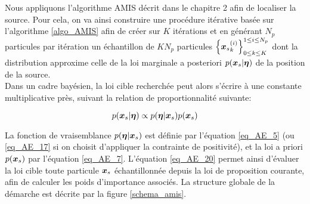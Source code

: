 Nous appliquons l'algorithme AMIS décrit dans le chapitre 2 afin de localiser la source. Pour cela, on va ainsi construire une procédure itérative basée sur l'algorithme \ref{algo_AMIS} afin de créer sur $K$ itérations et en générant $N_p$ particules par itération un échantillon de $KN_p$ particules {$\left\{{\bm{x}_s}_k^{(i)}\right\}_{0\leq k \leq K}^{1\leq i \leq N_p}$} dont la distribution approxime celle de la loi marginale a posteriori {$p({\bm{x}_s} | {\bm{\eta}})$} de la position de la source.\\

Dans un cadre bayésien, la loi cible recherchée peut alors s'écrire à une constante multiplicative près, suivant la relation de proportionnalité suivante:

\begin{equation}
{
p({\bm{x}_s}| {\bm{\eta}}) \propto p({\bm{\eta}}| {\bm{x}_s})p({\bm{x}_s})
\label{eq_AE_20}
}
\end{equation}

La fonction de vraisemblance {$p({\bm{\eta}} | {\bm{x}_s})$} est définie par l'équation \eqref{eq_AE_5} (ou \eqref{eq_AE_17} si on choisit d'appliquer la contrainte de positivité), et la loi a priori {$p({\bm{x}_s})$} par l'équation \eqref{eq_AE_7}. L'équation \eqref{eq_AE_20} permet ainsi d'évaluer la loi cible toute particule {${\bm{x}_s}$} échantillonnée depuis la loi de proposition courante, afin de calculer les poids d'importance {associés}. La structure globale de la démarche est décrite par la figure \ref{schema_amis}.\\


